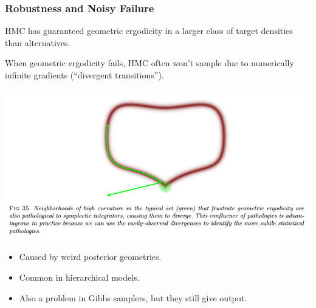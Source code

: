 \documentclass[xcolor=dvipsnames]{beamer}
\begin{document}
\begin{frame}
\frametitle{Robustness and Noisy Failure}
HMC has guaranteed geometric ergodicity in a larger class of target densities than alternatives.

\vspace{0.5cm}

When geometric ergodicity fails, HMC often won't sample due to numerically infinite gradients (``divergent transitions'').
\begin{center}
\includegraphics[height = 0.4\textheight]{divergent.png}
\end{center}
\begin{itemize}
\item Caused by weird posterior geometries.
\item Common in hierarchical models.
\item Also a problem in Gibbs samplers, but they still give output.
\end{itemize}
\end{frame}
\end{document}
